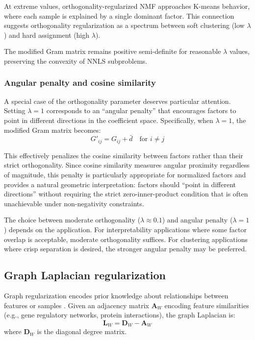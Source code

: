 \documentclass[article]{jss_modified}
\begin{document}
At extreme values, orthogonality-regularized NMF approaches K-means behavior, 
where each sample is explained by a single dominant factor. This connection 
suggests orthogonality regularization as a spectrum between soft clustering 
(low $\lambda$) and hard assignment (high $\lambda$).

The modified Gram matrix remains positive semi-definite for reasonable $\lambda$ 
values, preserving the convexity of NNLS subproblems.

\subsubsection{Angular penalty and cosine similarity}

A special case of the orthogonality parameter deserves particular attention. 
Setting $\lambda = 1$ corresponds to an ``angular penalty'' that encourages 
factors to point in different directions in the coefficient space. 
Specifically, when $\lambda = 1$, the modified Gram matrix becomes:
\begin{equation}
  G'_{ij} = G_{ij} + \bar{d} \quad \text{for } i \neq j
\end{equation}

This effectively penalizes the cosine similarity between factors rather than 
their strict orthogonality. Since cosine similarity measures angular proximity 
regardless of magnitude, this penalty is particularly appropriate for 
normalized factors and provides a natural geometric interpretation: factors 
should ``point in different directions'' without requiring the strict 
zero-inner-product condition that is often unachievable under non-negativity 
constraints.

The choice between moderate orthogonality ($\lambda \approx 0.1$) and angular 
penalty ($\lambda = 1$) depends on the application. For interpretability 
applications where some factor overlap is acceptable, moderate orthogonality 
suffices. For clustering applications where crisp separation is desired, the 
stronger angular penalty may be preferred.

\subsection{Graph Laplacian regularization}

Graph regularization encodes prior knowledge about relationships between 
features or samples \citep{Cai2011}. Given an adjacency matrix 
$\mathbf{A}_W$ encoding feature similarities (e.g., gene regulatory networks, 
protein interactions), the graph Laplacian is:
\begin{equation}
  \mathbf{L}_W = \mathbf{D}_W - \mathbf{A}_W
\end{equation}
where $\mathbf{D}_W$ is the diagonal degree matrix.
\end{document}
